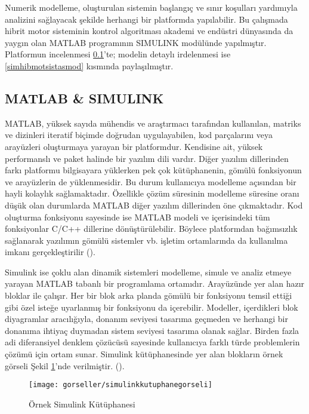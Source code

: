 Numerik modelleme, oluşturulan sistemin başlangıç ve sınır koşulları yardımıyla analizini sağlayacak şekilde herhangi bir 
platformda yapılabilir. Bu çalışmada hibrit motor sisteminin kontrol algoritması akademi ve endüstri dünyasında da yaygın olan MATLAB
programının SIMULINK modülünde yapılmıştır. Platformun incelenmesi \ref{matlabsimulink}'te; modelin detaylı irdelenmesi ise \ref{simhibmotsistasmod} kısmında paylaşılmıştır. 

\subsection{MATLAB \& SIMULINK}
\label{matlabsimulink}

MATLAB, yüksek sayıda mühendis ve araştırmacı tarafından kullanılan, matriks ve dizinleri iteratif biçimde doğrudan uygulayabilen, kod parçalarını veya arayüzleri 
oluşturmaya yarayan bir platformdur. Kendisine ait, yüksek performanslı ve paket halinde bir yazılım dili vardır. Diğer yazılım dillerinden farkı
platformu bilgisayara yüklerken pek çok kütüphanenin, gömülü fonksiyonun ve arayüzlerin de yüklenmesidir. Bu durum kullanıcıya modelleme açısından bir hayli kolaylık sağlamaktadır.
Özellikle çözüm süresinin modelleme süresine oranı düşük olan durumlarda MATLAB diğer yazılım dillerinden öne çıkmaktadır. Kod oluşturma fonksiyonu sayesinde ise
MATLAB modeli ve içerisindeki tüm fonksiyonlar C/C++ dillerine dönüştürülebilir. Böylece platformdan bağımsızlık sağlanarak yazılımın gömülü sistemler vb. işletim ortamlarında da kullanılma imkanı gerçekleştirilir  (\cite{matlabnedir}).

Simulink ise çoklu alan dinamik sistemleri modelleme, simule ve analiz etmeye yarayan MATLAB tabanlı bir programlama ortamıdır. Arayüzünde yer alan hazır bloklar ile çalışır. Her bir blok 
arka planda gömülü bir fonksiyonu temsil ettiği gibi özel isteğe uyarlanmış bir fonksiyonu da içerebilir.
Modeller, içerdikleri blok diyagramlar aracılığıyla, donanım seviyesi tasarıma geçmeden ve
herhangi bir donanıma ihtiyaç duymadan sistem seviyesi tasarıma olanak sağlar. Birden fazla adi diferansiyel denklem çözücüsü sayesinde kullanıcıya farklı türde problemlerin
çözümü için ortam sunar.
Simulink kütüphanesinde yer alan blokların örnek görseli Şekil \ref{fig:simulinkkutuphanegorseli}'nde verilmiştir. (\cite{simulinknedir}).

\begin{figure}[h]
    \centering
    \texttt{[image: gorseller/simulinkkutuphanegorseli]}
    \caption{Örnek Simulink Kütüphanesi}\label{fig:simulinkkutuphanegorseli}
\end{figure}

